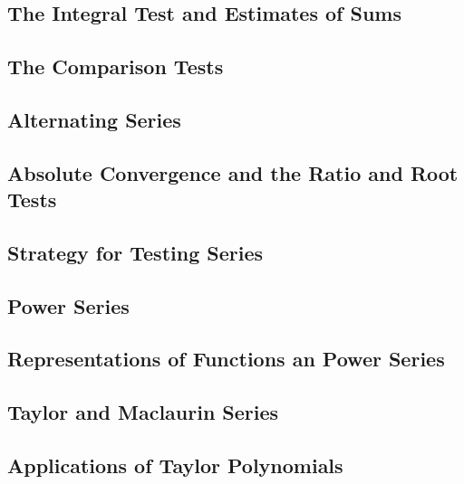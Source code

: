 \documentclass{article}
\begin{document}
    \subsection{The Integral Test and Estimates of Sums}
    \begin{outline}
        
    \end{outline}
    \subsection{The Comparison Tests}
    \begin{outline}
        
    \end{outline}
    \subsection{Alternating Series}
    \begin{outline}
        
    \end{outline}
    \subsection{Absolute Convergence and the Ratio and Root Tests}
    \begin{outline}
        
    \end{outline}
    \subsection{Strategy for Testing Series}
    \begin{outline}
        
    \end{outline}
    \subsection{Power Series}
    \begin{outline}
        
    \end{outline}
    \subsection{Representations of Functions an Power Series}
    \begin{outline}
        
    \end{outline}
    \subsection{Taylor and Maclaurin Series}
    \begin{outline}
        
    \end{outline}
    \subsection{Applications of Taylor Polynomials}
    \begin{outline}
        
    \end{outline}
\end{document}
